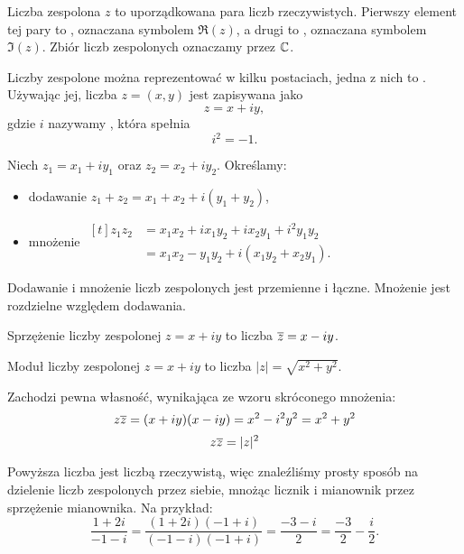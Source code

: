 \begin{definition}
    Liczba zespolona $z$ to uporządkowana para liczb rzeczywistych. Pierwszy element tej pary to , oznaczana symbolem $\Re(z)$, a drugi to , oznaczana symbolem $\Im(z)$. Zbiór liczb zespolonych oznaczamy przez $\mathbb C$.
\end{definition}

Liczby zespolone można reprezentować w kilku postaciach, jedna z nich to . Używając jej, liczba $z = (x, y)$ jest zapisywana jako
\[ z = x + iy, \]
gdzie $i$ nazywamy , która spełnia
\[ i^2 = -1. \]

Niech $z_1 = x_1 + iy_1$ oraz $z_2 = x_2 + iy_2$. Określamy:
\begin{itemize}
    \item dodawanie $z_1 + z_2 = x_1 + x_2 + i(y_1 + y_2)$,
    \item mnożenie $\begin{aligned}[t] z_1z_2 &= x_1x_2 + ix_1y_2 + ix_2y_1 + i^2y_1y_2 \\ &= x_1x_2 - y_1y_2 + i(x_1y_2 + x_2y_1).\end{aligned}$
\end{itemize}

\begin{corollary}
    Dodawanie i mnożenie liczb zespolonych jest przemienne i łączne. Mnożenie jest rozdzielne względem dodawania.
\end{corollary}

\begin{definition}
    Sprzężenie liczby zespolonej $z = x + iy$ to liczba $\overline{z} = x - iy$.
\end{definition}

\begin{definition}
    \label{d:magnitude}
    Moduł liczby zespolonej $z = x + iy$ to liczba $|z| = \sqrt{x^2 + y^2}$.
\end{definition}

Zachodzi pewna własność, wynikająca ze wzoru skróconego mnożenia:
\[ z\overline{z} = (x + iy)(x - iy) = x^2 - i^2y^2 = x^2 + y^2 \]
\begin{equation}
    z\overline{z} = |z|^2
\end{equation}

Powyższa liczba jest liczbą rzeczywistą, więc znaleźliśmy prosty sposób na dzielenie liczb zespolonych przez siebie, mnożąc licznik i mianownik przez sprzężenie mianownika. Na przykład:
\[ \frac{1 + 2i}{-1 - i} = \frac{(1 + 2i)(-1 + i)}{(-1 - i)(-1 + i)} = \frac{-3 -i}{2} = \frac{-3}{2} - \frac{i}{2}. \]

